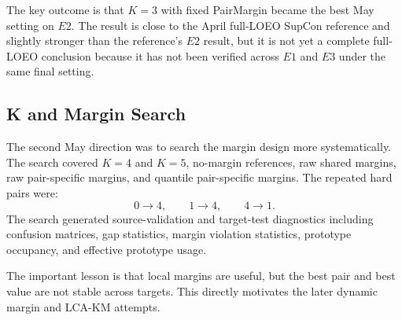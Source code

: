 \documentclass[11pt]{article}
\begin{document}
The key outcome is that $K=3$ with fixed PairMargin became the best May setting on $E2$. The result is close to the April full-LOEO SupCon reference and slightly stronger than the reference's $E2$ result, but it is not yet a complete full-LOEO conclusion because it has not been verified across $E1$ and $E3$ under the same final setting.

\subsection{K and Margin Search}

The second May direction was to search the margin design more systematically. The search covered $K=4$ and $K=5$, no-margin references, raw shared margins, raw pair-specific margins, and quantile pair-specific margins. The repeated hard pairs were:
\[
0{\rightarrow}4,\qquad 1{\rightarrow}4,\qquad 4{\rightarrow}1.
\]
The search generated source-validation and target-test diagnostics including confusion matrices, gap statistics, margin violation statistics, prototype occupancy, and effective prototype usage.

\begin{table}[H]
\centering
\small
\caption{Source-validation selected candidates from the K/margin search.}
\label{tab:kmargin_candidates}
%
\end{table}

The important lesson is that local margins are useful, but the best pair and best value are not stable across targets. This directly motivates the later dynamic margin and LCA-KM attempts.
\end{document}
